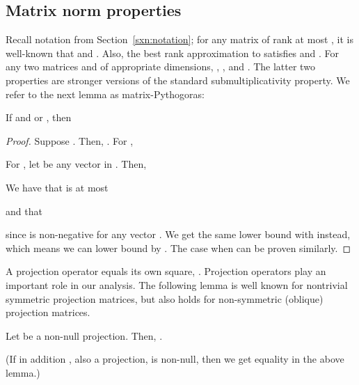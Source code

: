 \subsection{Matrix norm properties}

Recall notation from Section~\ref{sxn:notation}; for any matrix  of rank at most , it is well-known that  and . Also, the best rank  approximation to  satisfies  and . For any two matrices  and  of appropriate dimensions, \math{\TNorm{\matA}\le\FNorm{\matA}\le\sqrt{\rho}\TNorm{\matA}}, , and . The latter two properties are stronger versions of the standard submultiplicativity property. We refer to the next lemma as matrix-Pythogoras:
\begin{lemma}\label{lem:pyth}
If  and
 or , then
\end{lemma}
\begin{proof}
Suppose .
Then, \math{(\matX+\matY)(\matX+\matY)\transp=\matX\matX\transp + \matY\matY\transp}.
For ,

For , let  be any vector in . Then,

We have that
 is at most

and that

since  is non-negative for any vector .
We get the same lower bound with \math{\TNormS{\matY}} instead, which means
we can lower bound by \math{\max\{\TNormS{\matX},\TNormS{\matY}\}}.
The case when  can be proven similarly.
\end{proof}

A projection operator \math{\matP} equals
its own square, .
Projection operators play an important role in our analysis.
 The following lemma is well known
for nontrivial
symmetric projection matrices,
but also holds for non-symmetric (oblique) projection matrices.
\begin{lemma}\label{lemma:oblique}
Let \math{\matP} be a non-null projection. Then,
.
\end{lemma}
(If in addition \math{\matI-\matP}, also a projection,
is non-null, then we get equality in the
above lemma.)


